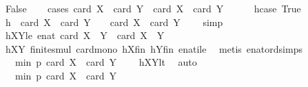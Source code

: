\begin{isabellebody}
\ False\isanewline
\ \ \isamarkupfalse%
\ {\isacharparenleft}{\kern0pt}cases\ {\isachardoublequoteopen}card\ {\isacharquery}{\kern0pt}X{}\ {\isacharplus}{\kern0pt}\ card\ {\isacharquery}{\kern0pt}Y{}\ {\isachargreater}{\kern0pt}\ card\ X\ {\isacharplus}{\kern0pt}\ card\ Y{\isachardoublequoteclose}{\isacharparenright}{\kern0pt}\isanewline
\ \ \ \ \isamarkupfalse%
\ hcase{\isacharcolon}{\kern0pt}\ True\isanewline
\ \ \ \ \isamarkupfalse%
\ \isamarkupfalse%
\ h\ {\isacharcolon}{\kern0pt}\ {\isachardoublequoteopen}card\ X\ {\isacharplus}{\kern0pt}\ card\ Y\ {\isacharminus}{\kern0pt}\ {}\ {\isasymle}\ card\ {\isacharquery}{\kern0pt}X{}\ {\isacharplus}{\kern0pt}\ card\ {\isacharquery}{\kern0pt}Y{}\ {\isacharminus}{\kern0pt}\ {}{\isachardoublequoteclose}\ \isamarkupfalse%
\ simp\isanewline
\ \ \ \ \isamarkupfalse%
\ hXY{}le{\isacharcolon}{\kern0pt}\ {\isachardoublequoteopen}enat\ {\isacharparenleft}{\kern0pt}card\ {\isacharparenleft}{\kern0pt}{\isacharquery}{\kern0pt}X{}\ {\isasymcdots}\ {\isacharquery}{\kern0pt}Y{}{\isacharparenright}{\kern0pt}{\isacharparenright}{\kern0pt}\ {\isasymle}\ card\ {\isacharparenleft}{\kern0pt}X\ {\isasymcdots}\ Y{\isacharparenright}{\kern0pt}{\isachardoublequoteclose}\ \isanewline
\ \ \ \ \ \ \isamarkupfalse%
\ hXY{}\ finite{\isacharunderscore}{\kern0pt}smul\ card{\isacharunderscore}{\kern0pt}mono\ hXfin\ hYfin\ enat{\isacharunderscore}{\kern0pt}ile\ \isamarkupfalse%
\ {\isacharparenleft}{\kern0pt}metis\ enat{\isacharunderscore}{\kern0pt}ord{\isacharunderscore}{\kern0pt}simps{\isacharparenleft}{\kern0pt}{}{\isacharparenright}{\kern0pt}{\isacharparenright}{\kern0pt}\isanewline
\ \ \ \ \isamarkupfalse%
\ \isamarkupfalse%
\ {\isachardoublequoteopen}{\isachardot}{\kern0pt}{\isachardot}{\kern0pt}{\isachardot}{\kern0pt}\ {\isacharless}{\kern0pt}\ min\ p\ {\isacharparenleft}{\kern0pt}card\ X\ {\isacharplus}{\kern0pt}\ card\ Y\ {\isacharminus}{\kern0pt}\ {}{\isacharparenright}{\kern0pt}{\isachardoublequoteclose}\ \isamarkupfalse%
\ hXYlt\ \isamarkupfalse%
\ auto\isanewline
\ \ \ \ \isamarkupfalse%
\ \isamarkupfalse%
\ {\isachardoublequoteopen}{\isachardot}{\kern0pt}{\isachardot}{\kern0pt}{\isachardot}{\kern0pt}\ {\isasymle}\ min\ p\ {\isacharparenleft}{\kern0pt}card\ {\isacharquery}{\kern0pt}X{}\ {\isacharplus}{\kern0pt}\ card\ {\isacharquery}{\kern0pt}Y{}\ {\isacharminus}{\kern0pt}\ {}{\isacharparenright}{\kern0pt}{\isachardoublequoteclose}\ \isanewline

\end{isabellebody}
